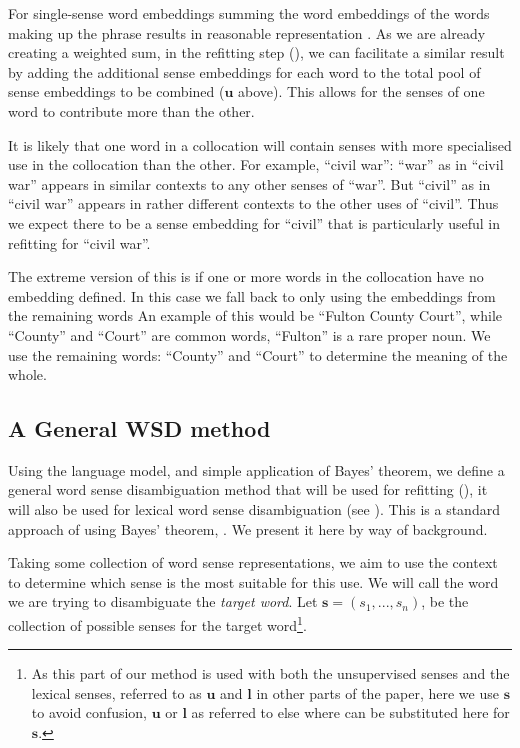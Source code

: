 \documentclass{sig-alternate}
\newcommand{\s}{\mathbf{s}}
\renewcommand{\l}{\mathbf{l}}
\renewcommand{\u}{\mathbf{u}}
\begin{document}
For single-sense word embeddings  summing the word embeddings of the words making up the phrase results in reasonable representation \parencite{mikolovSkip, White2015SentVecMeaning}.
As we are already creating a weighted sum, in the refitting step (), we can facilitate a similar result by adding the additional sense embeddings for each word to the total pool of sense embeddings to be combined ($\u$ above). This allows for the senses of one word to contribute more than the other.

It is likely that one word in a collocation will contain senses with more specialised use in the collocation than the other.
For example, \enquote{civil war}: \enquote{war} as in \enquote{civil war} appears in similar contexts to any other senses of \enquote{war}.
But \enquote{civil} as in \enquote{civil war} appears in rather different contexts to the other uses of \enquote{civil}. Thus we expect there to be a sense embedding for \enquote{civil} that is particularly useful in refitting for \enquote{civil war}.


The extreme version of this is if one or more words in the collocation have no embedding defined. In this case we fall back to only using the embeddings from the remaining words An example of this would be ``Fulton County Court'', while ``County'' and ``Court'' are common words, ``Fulton'' is a rare proper noun. We use the remaining words: ``County'' and ``Court'' to determine the meaning of the whole.



\subsection{A General WSD method} \label{generalwsd}
Using the language model, and simple application of Bayes' theorem, we define a general word sense disambiguation method that will be used for refitting (), it will also be used for lexical word sense disambiguation (see ). This is a standard approach of using Bayes' theorem, \parencite{tian2014probabilistic, AdaGrams}. We present it here by way of background.

Taking some collection of word sense representations, we aim to use the context to determine which sense is the most suitable for this use.
We will call the word we are trying to disambiguate the \emph{target word}.
Let $\s=(s_{1},...,s_{n})$, be the collection of possible senses for the target word\footnote{As this part of our method is used with both the unsupervised senses and the lexical senses, referred to as $\u$ and $\l$ in other parts of the paper, here we use $\s$ to avoid confusion, $\u$ or $\l$ as referred to else where can be substituted here for $\s$.}.
\end{document}
